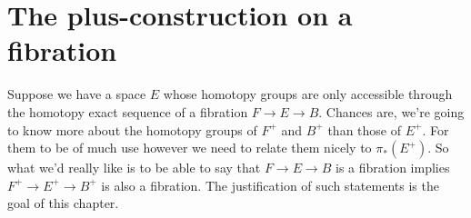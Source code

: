 \chapter{The plus-construction on a fibration} %
\label{cha:6the_plus_construction_on_a_fibration}
Suppose we have a space $E$ whose homotopy groups are only accessible through the homotopy exact sequence of a fibration $F \longrightarrow E \longrightarrow  B$. Chances are, we're going to know more about the homotopy groups of $F^+$ and $B^+$ than those of $E^+$. For them to be of much use however we need to relate them nicely to $\pi_*(E^+)$. So what we'd really like is to be able to say that $F \longrightarrow  E \longrightarrow B$ is a fibration implies $F^+ \longrightarrow E^+\longrightarrow  B^+$ is also a fibration. The justification of such statements is the goal of this chapter.

